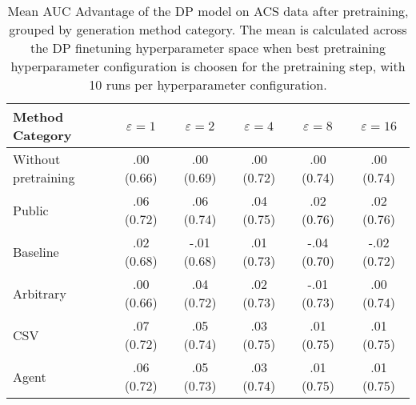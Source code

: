 \begin{table}[h!]
    \centering
    \caption{Mean AUC Advantage of the DP model on ACS data after pretraining, grouped by generation method category. The mean is calculated across the DP finetuning hyperparameter space when best pretraining hyperparameter configuration is choosen for the pretraining step, with 10 runs per hyperparameter configuration.}
    \label{tab:epsilon_comparison}
    \begin{tabular}{lccccc}
    \toprule
    Method Category & $\varepsilon=1$ & $\varepsilon=2$ & $\varepsilon=4$ & $\varepsilon=8$ & $\varepsilon=16$ \\
    \midrule
    Without pretraining & .00 {\small (0.66)} & .00 {\small (0.69)} & .00 {\small (0.72)} & .00 {\small (0.74)} & .00 {\small (0.74)} \\
    \arrayrulecolor{black!50!}\midrule
    Public & \cellcolor{silver!30}.06 {\small (0.72)} & \cellcolor{gold!30}.06 {\small (0.74)} & \cellcolor{gold!30}.04 {\small (0.75)} & \cellcolor{gold!30}.02 {\small (0.76)} & \cellcolor{gold!30}.02 {\small (0.76)} \\
    \arrayrulecolor{black!50!}\midrule
    Baseline & .02 {\small (0.68)} & -.01 {\small (0.68)} & .01 {\small (0.73)} & -.04 {\small (0.70)} & -.02 {\small (0.72)} \\
    \arrayrulecolor{black!50!}\midrule
    Arbitrary & .00 {\small (0.66)} & .04 {\small (0.72)} & .02 {\small (0.73)} & -.01 {\small (0.73)} & .00 {\small (0.74)} \\
    \arrayrulecolor{black!50!}\midrule
    CSV & \cellcolor{gold!30}.07 {\small (0.72)} & \cellcolor{silver!30}.05 {\small (0.74)} & \cellcolor{silver!30}.03 {\small (0.75)} & \cellcolor{silver!30}.01 {\small (0.75)} & \cellcolor{silver!30}.01 {\small (0.75)} \\
    Agent & \cellcolor{bronze!30}.06 {\small (0.72)} & \cellcolor{bronze!30}.05 {\small (0.73)} & \cellcolor{bronze!30}.03 {\small (0.74)} & \cellcolor{bronze!30}.01 {\small (0.75)} & \cellcolor{bronze!30}.01 {\small (0.75)} \\
    \bottomrule
    \end{tabular}
\end{table}